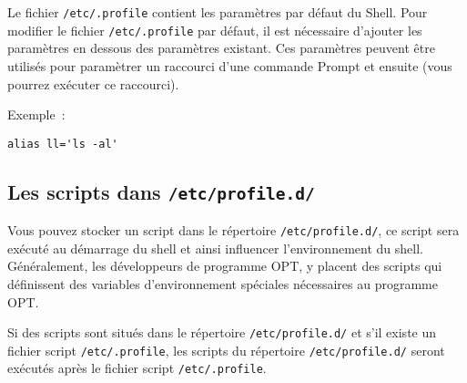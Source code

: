 Le fichier \texttt{/etc/.profile} contient les paramètres par défaut du Shell.
Pour modifier le fichier \texttt{/etc/.profile} par défaut, il est nécessaire d'ajouter
les paramètres en dessous des paramètres existant. Ces paramètres peuvent être utilisés
pour paramètrer un raccourci d'une commande Prompt et ensuite (vous pourrez exécuter
\og{}ce raccourci\fg{}).


Exemple~:

\begin{example}
\begin{verbatim}
alias ll='ls -al'
\end{verbatim}
\end{example}


\subsection{Les scripts dans \texttt{/etc/profile.d/}}

Vous pouvez stocker un script dans le répertoire \texttt{/etc/profile.d/},
ce script sera exécuté au démarrage du shell et ainsi influencer l’environnement
du shell. Généralement, les développeurs de programme OPT, y placent des scripts
qui définissent des variables d'environnement spéciales nécessaires au programme OPT.

Si des scripts sont situés dans le répertoire \texttt{/etc/profile.d/} et s'il
existe un fichier script \texttt{/etc/.profile}, les scripts du répertoire
\texttt{/etc/profile.d/} seront exécutés après le fichier script \texttt{/etc/.profile}.
